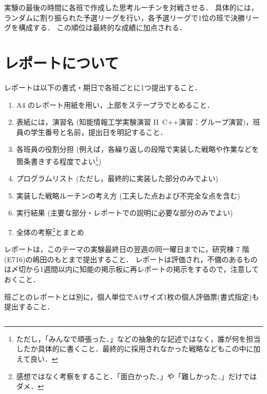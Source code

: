 実験の最後の時間に各班で作成した思考ルーチンを対戦させる．
具体的には，ランダムに割り振られた予選リーグを行い，各予選リーグで1位の班で決勝リーグを構成する．
この順位は最終的な成績に加点される．

\section{レポートについて}
レポートは以下の書式・期日で各班ごとに1つ提出すること．
\begin{enumerate}
 \item A4 のレポート用紙を用い，上部をステープラでとめること．\vspace*{-0.5em}
 \item 表紙には，演習名 (知能情報工学実験演習 II\ C++演習：グループ演習)，班員の学生番号と名前，提出日を明記すること．\vspace*{-0.5em}
 \item 各班員の役割分担 (例えば，各繰り返しの段階で実装した戦略や作業などを箇条書きする程度でよい\footnote{ただし，「みんなで頑張った．」などの抽象的な記述ではなく，誰が何を担当したか具体的に書くこと．最終的に採用されなかった戦略などもこの中に加えて良い．})\vspace*{-0.5em}
 \item プログラムリスト (ただし，最終的に実装した部分のみでよい)\vspace*{-0.5em}
 \item 実装した戦略ルーチンの考え方 (工夫した点および不完全な点を含む)\vspace*{-0.5em}
 \item 実行結果 (主要な部分・レポートでの説明に必要な部分のみでよい)\vspace*{-0.5em}
 \item 全体の考察\footnote{感想ではなく考察をすること．「面白かった．」や「難しかった．」だけではダメ．}とまとめ\vspace*{-0.5em}
 \end{enumerate}
レポートは，このテーマの実験最終日の翌週の同一曜日までに，研究棟 7 階(E716)の嶋田のもとまで提出すること．
レポートは評価され，不備のあるものは〆切から1週間以内に知能の掲示板に再レポートの掲示をするので，注意しておくこと．

班ごとのレポートとは別に，個人単位でA4サイズ1枚の個人評価票(書式指定)も提出すること．


\begin{quote}
\begin{verbatim}

\end{verbatim}
\end{quote}

